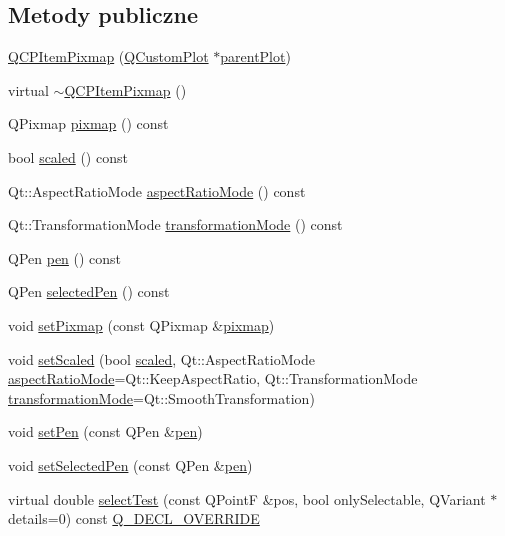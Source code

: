 \subsection*{Metody publiczne}
\begin{DoxyCompactItemize}
\item 
\hyperlink{class_q_c_p_item_pixmap_aa6de42a37261b21a5480e7da122345c3}{Q\+C\+P\+Item\+Pixmap} (\hyperlink{class_q_custom_plot}{Q\+Custom\+Plot} $\ast$\hyperlink{class_q_c_p_layerable_ab7e0e94461566093d36ffc0f5312b109}{parent\+Plot})
\item 
virtual \hyperlink{class_q_c_p_item_pixmap_a810cac6a409d963cda6ea2d3152f1fd0}{$\sim$\+Q\+C\+P\+Item\+Pixmap} ()
\item 
Q\+Pixmap \hyperlink{class_q_c_p_item_pixmap_a73dea89e0eb45127a2705e2c7991b8d8}{pixmap} () const 
\item 
bool \hyperlink{class_q_c_p_item_pixmap_a54026b89dff3c60376c2360f01b6fb83}{scaled} () const 
\item 
Qt\+::\+Aspect\+Ratio\+Mode \hyperlink{class_q_c_p_item_pixmap_ac5b95c097169e107a61eebbb7c77523c}{aspect\+Ratio\+Mode} () const 
\item 
Qt\+::\+Transformation\+Mode \hyperlink{class_q_c_p_item_pixmap_a1d4751a7b9588354fc8e726d891153f7}{transformation\+Mode} () const 
\item 
Q\+Pen \hyperlink{class_q_c_p_item_pixmap_ab2b821c80cfade589472e933b9c4361f}{pen} () const 
\item 
Q\+Pen \hyperlink{class_q_c_p_item_pixmap_af8e839d7c7b84e214608feda3caec2bc}{selected\+Pen} () const 
\item 
void \hyperlink{class_q_c_p_item_pixmap_a726b69ea4025edf48f9b29b6450548a7}{set\+Pixmap} (const Q\+Pixmap \&\hyperlink{class_q_c_p_item_pixmap_a73dea89e0eb45127a2705e2c7991b8d8}{pixmap})
\item 
void \hyperlink{class_q_c_p_item_pixmap_ab4d44529a1c6c8d37d0ea7560e042777}{set\+Scaled} (bool \hyperlink{class_q_c_p_item_pixmap_a54026b89dff3c60376c2360f01b6fb83}{scaled}, Qt\+::\+Aspect\+Ratio\+Mode \hyperlink{class_q_c_p_item_pixmap_ac5b95c097169e107a61eebbb7c77523c}{aspect\+Ratio\+Mode}=Qt\+::\+Keep\+Aspect\+Ratio, Qt\+::\+Transformation\+Mode \hyperlink{class_q_c_p_item_pixmap_a1d4751a7b9588354fc8e726d891153f7}{transformation\+Mode}=Qt\+::\+Smooth\+Transformation)
\item 
void \hyperlink{class_q_c_p_item_pixmap_acdade1305edb4b5cae14f97fd132065f}{set\+Pen} (const Q\+Pen \&\hyperlink{class_q_c_p_item_pixmap_ab2b821c80cfade589472e933b9c4361f}{pen})
\item 
void \hyperlink{class_q_c_p_item_pixmap_afc5e479e88e53740176ce77cb70dd67a}{set\+Selected\+Pen} (const Q\+Pen \&\hyperlink{class_q_c_p_item_pixmap_ab2b821c80cfade589472e933b9c4361f}{pen})
\item 
virtual double \hyperlink{class_q_c_p_item_pixmap_a65d1ede7bb479b90d40186d083071947}{select\+Test} (const Q\+PointF \&pos, bool only\+Selectable, Q\+Variant $\ast$details=0) const \hyperlink{qcustomplot_8hh_a42cc5eaeb25b85f8b52d2a4b94c56f55}{Q\+\_\+\+D\+E\+C\+L\+\_\+\+O\+V\+E\+R\+R\+I\+DE}
\end{DoxyCompactItemize}
